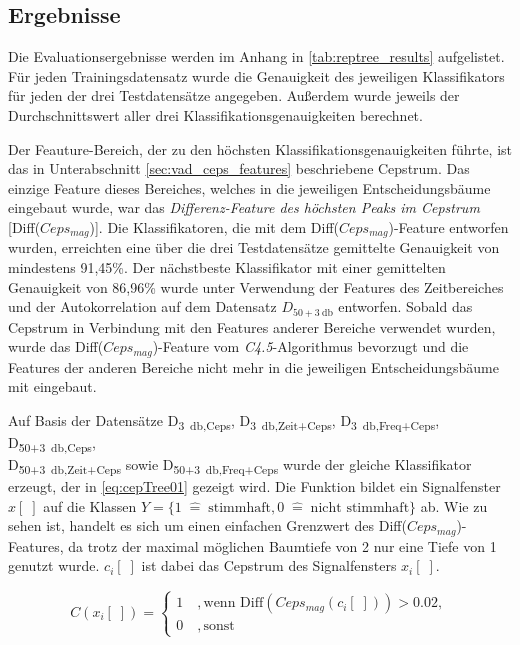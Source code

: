 \subsection{Ergebnisse}
\label{sec:vad_results}

Die Evaluationsergebnisse werden im Anhang in \autoref{tab:reptree_results} aufgelistet. Für jeden Trainingsdatensatz wurde die Genauigkeit des jeweiligen Klassifikators für jeden der drei Testdatensätze angegeben. Außerdem wurde jeweils der Durchschnittswert aller drei Klassifikationsgenauigkeiten berechnet.

Der Feauture-Bereich, der zu den höchsten Klassifikationsgenauigkeiten führte, ist das in Unterabschnitt \ref{sec:vad_ceps_features} beschriebene Cepstrum. Das einzige Feature dieses Bereiches, welches in die jeweiligen Entscheidungsbäume eingebaut wurde, war das \emph{Differenz-Feature des höchsten Peaks im Cepstrum} [Diff($Ceps_{mag}$)]. Die Klassifikatoren, die mit dem Diff($Ceps_{mag}$)-Feature entworfen wurden, erreichten eine über die drei Testdatensätze gemittelte Genauigkeit von mindestens 91,45\%. Der nächstbeste Klassifikator mit einer gemittelten Genauigkeit von 86,96\% wurde unter Verwendung der Features des Zeitbereiches und der Autokorrelation auf dem Datensatz $D_{50+\SI{3}{\decibel}}$ entworfen. Sobald das Cepstrum in Verbindung mit den Features anderer Bereiche verwendet wurden, wurde das Diff($Ceps_{mag}$)-Feature vom \emph{C4.5}-Algorithmus bevorzugt und die Features der anderen Bereiche nicht mehr in die jeweiligen Entscheidungsbäume mit eingebaut.

Auf Basis der Datensätze D\textsubscript{\SI{3}{\decibel},Ceps}, D\textsubscript{\SI{3}{\decibel},Zeit+Ceps}, D\textsubscript{\SI{3}{\decibel},Freq+Ceps}, D\textsubscript{50+\SI{3}{\decibel},Ceps}, \\ D\textsubscript{50+\SI{3}{\decibel},Zeit+Ceps} sowie D\textsubscript{50+\SI{3}{\decibel},Freq+Ceps} wurde der gleiche Klassifikator erzeugt, der in \autoref{eq:cepTree01} gezeigt wird. Die Funktion bildet ein Signalfenster $x[\;]$ auf die Klassen $Y = \{ 1 \; \hat{=} \; \text{stimmhaft}, 0 \; \hat{=} \; \text{nicht stimmhaft}\}$ ab. Wie zu sehen ist, handelt es sich um einen einfachen Grenzwert des Diff($Ceps_{mag}$)-Features, da trotz der maximal möglichen Baumtiefe von 2 nur eine Tiefe von 1 genutzt wurde. $c_i[\;]$ ist dabei das Cepstrum des Signalfensters $x_i[\;]$.

\begin{equation}
C(x_i[\;]) = \begin{cases}
1 \quad , \text{wenn  Diff}(Ceps_{mag}(c_i[\;])) > 0.02, \\
0 \quad , \text{sonst}
\end{cases}
\label{eq:cepTree01}
\end{equation}


